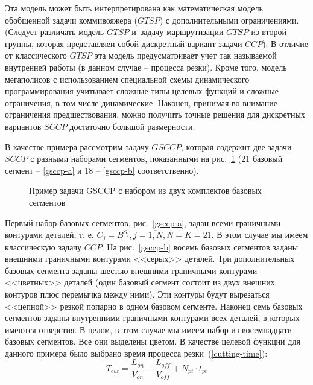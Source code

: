 \documentclass[11pt,twoside,openany]{report}
\begin{document}
Эта модель может быть интерпретирована
как математическая модель обобщенной задачи коммивояжера ($GTSP$)
с дополнительными ограничениями.
(Следует различать модель $GTSP$
и~задачу маршрутизации $GTSP$ из второй группы,
которая представляеи собой дискретный вариант задачи $CCP$).
В отличие от классического $GTSP$ эта модель
предусматривает учет так называемой внутренней работы
(в данном случае -- процесса резки).
Кроме того, модель мегаполисов с
использованием специальной схемы динамического программирования
учитывает сложные типы целевых функций и сложные ограничения,
в том числе динамические.
Наконец, принимая во внимание ограничения предшествования,
можно получить точные решения для дискретных вариантов $SCCP$
достаточно большой размерности.

В качестве примера рассмотрим задачу $GSCCP$,
которая содержит две
задачи $SCCP$ с разными наборами сегментов,
показанными на рис.~\ref{gsccp-both}
(21 базовый сегмент -- \ref{gsccp-a}
и 18 -- \ref{gsccp-b} соответственно).

\begin{figure}[h]
  \centering
  \caption{Пример задачи GSCCP с набором из двух комплектов базовых сегментов}
  \label{gsccp-both}
\end{figure}

Первый набор базовых сегментов,
рис.~\ref{gsccp-a},
задан всеми граничными контурами деталей, т. е.
$C_j = B^{S_j}, j=\overline{1,N}, N=K=21$.
В этом случае мы имеем классическую задачу $CCP$.
На рис.~\ref{gsccp-b} восемь
базовых сегментов заданы внешними граничными контурами <<серых>> деталей.
Три дополнительных базовых сегмента заданы шестью
внешними граничными контурами <<цветных>> деталей
(один базовый сегмент состоит из двух внешних контуров плюс перемычка между ними).
Эти контуры будут вырезаться <<цепной>> резкой попарно в одном базовом сегменте.
Наконец семь базовых сегментов заданы внутренними
граничными контурами всех деталей,
в которых имеются отверстия.
В целом, в этом случае мы имеем набор из восемнадцати
базовых сегментов.
Все они выделены цветом.
В качестве целевой функции для данного примера было выбрано
время процесса резки~(\ref{cutting-time}):
$$
T_{cut} = \frac{L_{on}}{V_{on}} + \frac{L_{off}}{V_{off}} +N_{pt} \cdot t_{pt}
$$
\end{document}
